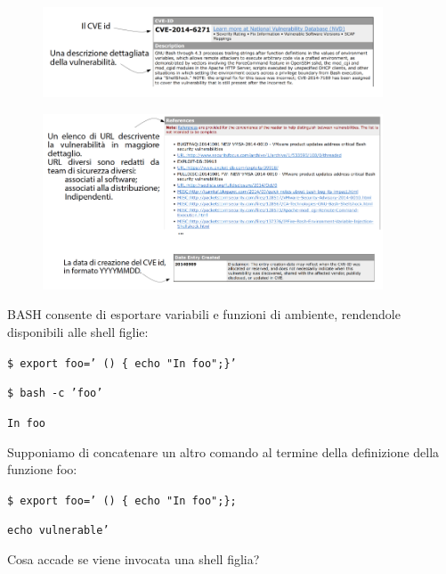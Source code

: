 \begin{figure}[hbpt!]
    \centering
    \includegraphics[width=0.9\textwidth]{./Images/cap2/2.4.png}
\end{figure}
\FloatBarrier

\begin{figure}[hbpt!]
    \centering
    \includegraphics[width=0.9\textwidth]{./Images/cap2/2.5.png}
\end{figure}
\FloatBarrier

BASH consente di esportare variabili e funzioni di
ambiente, rendendole disponibili alle shell figlie:

\vspace{5mm}

\texttt{\$ export foo=' () \{ echo "In foo";\}'}

\texttt{\$ bash -c 'foo'}

\texttt{In foo}

\vspace{5mm}

Supponiamo di concatenare un altro comando al
termine della definizione della funzione foo:

\vspace{5mm}

\texttt{\$ export foo=' () \{ echo "In foo";\};}

\texttt{echo vulnerable'}

\vspace{5mm}

Cosa accade se viene invocata una shell figlia?

\vspace{5mm}

